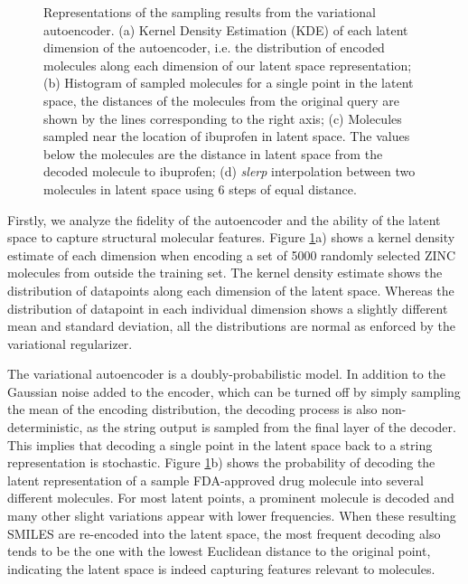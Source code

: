 \begin{figure}
    \caption[Sampling the Latent Space of the Variational Autoencoder]{Representations of the sampling results from the variational autoencoder. (a) Kernel Density Estimation (KDE) of each latent dimension of the autoencoder, i.e. the distribution of encoded molecules along each dimension of our latent space representation; (b) Histogram of sampled molecules for a single point in the latent space, the distances of the molecules from the original query are shown by the lines corresponding to the right axis; (c) Molecules sampled near the location of ibuprofen in latent space. The values below the molecules are the distance in latent space from the decoded molecule to ibuprofen; (d) \textit{slerp} interpolation between two molecules in latent space using 6 steps of equal distance.} 
    \label{fig:interpolation_figures}
\end{figure}



Firstly, we analyze the fidelity of the autoencoder and the ability of the latent space to capture structural molecular features.
Figure \ref{fig:interpolation_figures}a) shows a kernel density estimate of each dimension when encoding a set of 5000 randomly selected ZINC molecules from outside the training set. The kernel density estimate shows the distribution of datapoints along each dimension of the latent space.
 Whereas the distribution of datapoint in each individual dimension shows a slightly different mean and standard deviation, all the distributions are normal as enforced by the variational regularizer. 

The variational autoencoder is a doubly-probabilistic model. In addition to the Gaussian noise added to the encoder, which can be turned off by simply sampling the mean of the encoding distribution, the decoding process is also non-deterministic, as the string output is sampled from the final layer of the decoder.
This implies that decoding a single point in the latent space back to a string representation is stochastic. Figure \ref{fig:interpolation_figures}b) shows the probability of decoding the latent representation of a sample FDA-approved drug molecule into several different molecules. For most latent points, a prominent molecule is decoded and many other slight variations appear with lower frequencies. When these resulting SMILES are re-encoded into the latent space, the most frequent decoding also tends to be the one with the lowest Euclidean distance to the original point, indicating the latent space is indeed capturing features relevant to molecules. 

